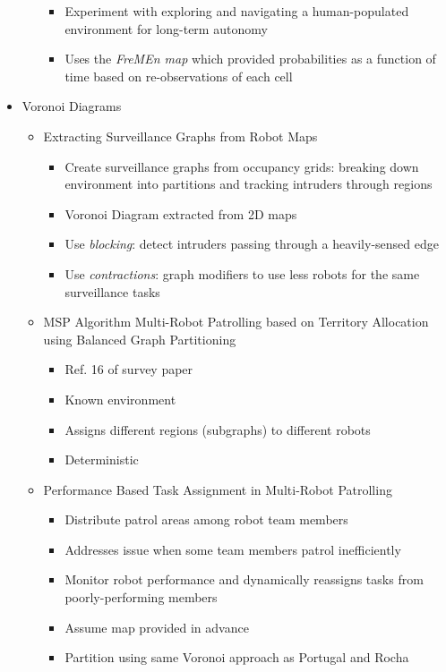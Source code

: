 \documentclass[review]{elsarticle}
\begin{document}
\begin{itemize}
\begin{itemize}
\begin{itemize}
			\item Experiment with exploring and navigating a human-populated environment for long-term autonomy
			\item Uses the \emph{FreMEn map} which provided probabilities as a function of time based on re-observations of each cell
		\end{itemize}
	\end{itemize}
	\item Voronoi Diagrams
	\begin{itemize}
		\item Extracting Surveillance Graphs from Robot Maps~\cite{KolCar08}
		\begin{itemize}
			\item Create surveillance graphs from occupancy grids: breaking down environment into partitions and tracking intruders through regions
			\item Voronoi Diagram extracted from 2D maps
			\item Use \emph{blocking}: detect intruders passing through a heavily-sensed edge
			\item Use \emph{contractions}: graph modifiers to use less robots for the same surveillance tasks
		\end{itemize}
		\item MSP Algorithm Multi-Robot Patrolling based on Territory Allocation using Balanced Graph Partitioning~\cite{PorRoc10}
		\begin{itemize}
			\item Ref. 16 of survey paper
			\item Known environment
			\item Assigns different regions (subgraphs) to different robots
			\item Deterministic
		\end{itemize}
		\item Performance Based Task Assignment in Multi-Robot Patrolling~\cite{PipChrWei13}
		\begin{itemize}
			\item Distribute patrol areas among robot team members
			\item Addresses issue when some team members patrol inefficiently
			\item Monitor robot performance and dynamically reassigns tasks from poorly-performing members
			\item Assume map provided in advance
			\item Partition using same Voronoi approach as Portugal and Rocha

\end{itemize}
\end{itemize}
\end{itemize}
\end{document}
